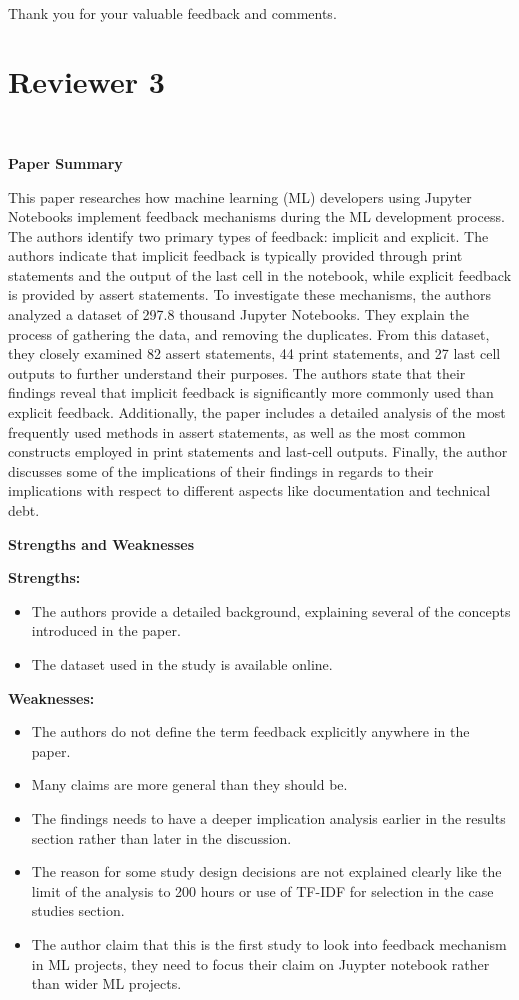 \documentclass[11pt,fleqn]{article}
\newcommand{\eline}{\vspace*{.75\baselineskip}}
\newcommand{\Referee}[1]{\eline \noindent {\bf Reviewer comment #1:} \\}
\newcommand{\Us}{\eline \noindent {\bf Response:}\\}
\newcommand{\newreviewer}[1]{\section*{Reviewer #1}\vspace*{-1.05\baselineskip}}
\newenvironment{revcomment}[1][]
{\Referee{#1}\begin{rcomment}}
{\end{rcomment}}
\begin{document}
\Us Thank you for your valuable feedback and comments.

\newreviewer{3}
\begin{revcomment}[3.1]
  \textbf{Paper Summary}

  This paper researches how machine learning (ML) developers using Jupyter Notebooks implement feedback mechanisms during the ML development process. The authors identify two primary types of feedback: implicit and explicit. The authors indicate that implicit feedback is typically provided through print statements and the output of the last cell in the notebook, while explicit feedback is provided by assert statements. To investigate these mechanisms, the authors analyzed a dataset of 297.8 thousand Jupyter Notebooks. They explain the process of gathering the data, and removing the duplicates. From this dataset, they closely examined 82 assert statements, 44 print statements, and 27 last cell outputs to further understand their purposes. The authors state that their findings reveal that implicit feedback is significantly more commonly used than explicit feedback. Additionally, the paper includes a detailed analysis of the most frequently used methods in assert statements, as well as the most common constructs employed in print statements and last-cell outputs. Finally, the author discusses some of the implications of their findings in regards to their implications with respect to different aspects like documentation and technical debt.

  \textbf{Strengths and Weaknesses}

  \textbf{Strengths:}
  \begin{itemize}
    \item The authors provide a detailed background, explaining several of the concepts introduced in the paper.
    \item The dataset used in the study is available online.
  \end{itemize}

  \textbf{Weaknesses:}
  \begin{itemize}
    \item The authors do not define the term feedback explicitly anywhere in the paper.
    \item Many claims are more general than they should be.
    \item The findings needs to have a deeper implication analysis earlier in the results section rather than later in the discussion.
    \item The reason for some study design decisions are not explained clearly like the limit of the analysis to 200 hours or use of TF-IDF for selection in the case studies section.
    \item The author claim that this is the first study to look into feedback mechanism in ML projects, they need to focus their claim on Juypter notebook rather than wider ML projects.
  \end{itemize}
\end{revcomment}
\end{document}

